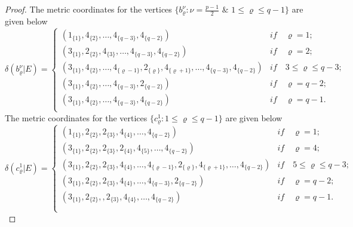 \documentclass[]{interact}
\theoremstyle{plain}%
\theoremstyle{definition}
\theoremstyle{remark}
\begin{document}
\begin{proof}
                    \noindent The metric coordinates for the vertices 
                     $\{b^\nu_\varrho: \nu =\frac{p-1}{2} $ $\&$  $1\leq \varrho\leq q-1 \}$ are given below
                        \begin{equation*}
                        \delta(b^{\nu}_{\varrho}|E)=
                   \begin{cases}
                   (1_{\{1\}},4_{\{2\}},\ldots,4_{\{q-3\}},4_{\{q-2\}})&\textit{if}\quad\varrho= 1;\\
                   (3_{\{1\}},2_{\{ 2\}},4_{\{3\}}, \ldots,4_{\{q-3\}},4_{\{q-2\}})&\textit{if}\quad   \varrho= 2;\\
                   (3_{\{1\}},4_{\{2\}}, \ldots,4_{\{\varrho-1\}},2_{\{ \varrho\}},4_{\{\varrho +1\}},\ldots,4_{\{q-3\}},4_{\{q-2\}})&\textit{if}\quad  3\leq  \varrho  \leq q-3  ;\\
                      (3_{\{1\}},4_{\{2\}},\ldots,4_{\{q-3\}},2_{\{q-2\}})& \textit{if}\quad \varrho = q-2  ;\\
                (3_{\{1\}},4_{\{2\}}, \ldots,4_{\{q-3\}},4_{\{q-2\}})&\textit{if}\quad\varrho= q-1.\\
                      \end{cases}
                    \end{equation*}
                     \noindent The metric coordinates for the vertices 
                     $\{c^1_\varrho: 1\leq \varrho\leq q-1 \}$ are given below
                        \begin{equation*}
                        \delta(c^{1}_{\varrho}|E)=
                   \begin{cases}
                   (1_{\{1\}},2_{\{2\}},2_{\{3\}},4_{\{4\}},\ldots,4_{\{q-2\}})&\textit{if}\quad\varrho= 1;\\
                     (3_{\{1\}},2_{\{2\}}, 2_{\{3 \}},2_{\{ 4 \}}, 4_{\{ 5 \}},\ldots,4_{\{q-2\}})&\textit{if}\quad  \varrho= 4;\\
                     (3_{\{1\}},2_{\{2\}}, 2_{\{3 \}},4_{\{ 4 \}}, \ldots, 4_{\{\varrho-1 \}},2_{\{\varrho \}}, 4_{\{\varrho+1 \}},\ldots,4_{\{q-2\}})&\textit{if}\quad 5 \leq  \varrho  \leq q-3  ;\\
                     (3_{\{1\}},2_{\{2\}}, 2_{\{3 \}},4_{\{ 4 \}},\ldots, 4_{\{q-3\}},2_{\{q-2\}})&\textit{if}\quad \varrho= q-2;\\
                    (3_{\{1\}},2_{\{2\}},,2_{\{3\}}, 4_{\{4\}},\ldots,4_{\{q-2\}}) &\textit{if}\quad\varrho= q-1.\\\\
                    

\end{cases}
\end{equation*}
\end{proof}
\end{document}
